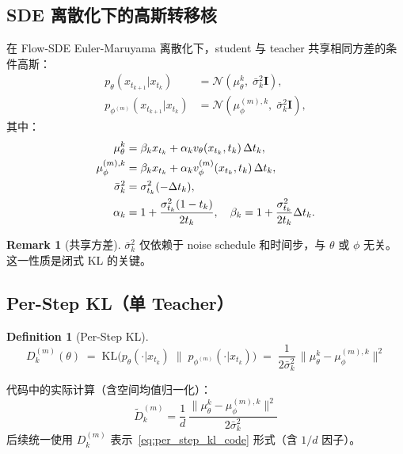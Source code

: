 \documentclass[11pt,a4paper]{article}
\newcommand{\KL}{\mathrm{KL}}
\newcommand{\N}{\mathcal{N}}
\newcommand{\vtheta}{v_\theta}
\newcommand{\vphi}{v_\phi}
\newcommand{\mutheta}{\mu_\theta}
\newcommand{\muphi}{\mu_\phi}
\newcommand{\sigbar}{\bar{\sigma}}
\theoremstyle{definition}
\newtheorem{definition}{Definition}
\newtheorem{remark}{Remark}
\begin{document}
\subsection{SDE 离散化下的高斯转移核}

在 Flow-SDE Euler-Maruyama 离散化下，student 与 teacher 共享相同方差的条件高斯：
\begin{align}
p_\theta(x_{t_{k+1}} | x_{t_k}) &= \N(\mutheta^k,\; \sigbar_k^2 \bm{I}), \\
p_{\phi^{(m)}}(x_{t_{k+1}} | x_{t_k}) &= \N(\muphi^{(m),k},\; \sigbar_k^2 \bm{I}),
\end{align}
其中：
\begin{align}
\mutheta^k &= \beta_k x_{t_k} + \alpha_k \vtheta(x_{t_k}, t_k)\, \Delta t_k, \label{eq:mu_student}\\
\muphi^{(m),k} &= \beta_k x_{t_k} + \alpha_k \vphi^{(m)}(x_{t_k}, t_k)\, \Delta t_k, \label{eq:mu_teacher}\\
\sigbar_k^2 &= \sigma_{t_k}^2 (-\Delta t_k), \label{eq:sigma_bar}\\
\alpha_k &= 1 + \frac{\sigma_{t_k}^2(1-t_k)}{2t_k}, \quad
\beta_k = 1 + \frac{\sigma_{t_k}^2}{2t_k}\Delta t_k. \notag
\end{align}

\begin{remark}[共享方差]
$\sigbar_k^2$ 仅依赖于 noise schedule 和时间步，与 $\theta$ 或 $\phi$ 无关。这一性质是闭式 KL 的关键。
\end{remark}

\subsection{Per-Step KL（单 Teacher）}

\begin{definition}[Per-Step KL]
\begin{equation}
\boxed{
D_k^{(m)}(\theta) \;=\; \KL\!\bigl(p_\theta(\cdot|x_{t_k}) \;\|\; p_{\phi^{(m)}}(\cdot|x_{t_k})\bigr)
\;=\; \frac{1}{2\sigbar_k^2}\,\|\mutheta^k - \muphi^{(m),k}\|^2
}
\label{eq:per_step_kl}
\end{equation}
\end{definition}

\noindent 代码中的实际计算（含空间均值归一化）：
\begin{equation}
\tilde{D}_k^{(m)} = \frac{1}{d}\,\frac{\|\mutheta^k - \muphi^{(m),k}\|^2}{2\sigbar_k^2}
\label{eq:per_step_kl_code}
\end{equation}
后续统一使用 $D_k^{(m)}$ 表示~\eqref{eq:per_step_kl_code} 形式（含 $1/d$ 因子）。
\end{document}
